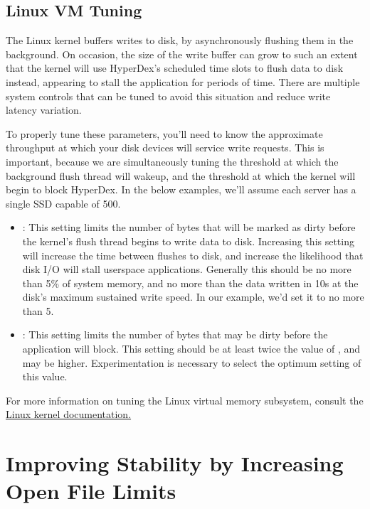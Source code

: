 \subsection{Linux VM Tuning}

The Linux kernel buffers writes to disk, by asynchronously flushing them in the
background.  On occasion, the size of the write buffer can grow to such an
extent that the kernel will use HyperDex's scheduled time slots to flush data to
disk instead, appearing to stall the application for periods of time.  There are
multiple system controls that can be tuned to avoid this situation and reduce
write latency variation.

To properly tune these parameters, you'll need to know the approximate
throughput at which your disk devices will service write requests.  This is
important, because we are simultaneously tuning the threshold at which the
background flush thread will wakeup, and the threshold at which the kernel will
begin to block HyperDex.  In the below examples, we'll assume each server has a
single SSD capable of \unit{500}{\mega\byte\per\second}.

\begin{itemize}
    \item {}:  This setting limits the number
        of bytes that will be marked as dirty before the kernel's flush thread
        begins to write data to disk.  Increasing this setting will increase the
        time between flushes to disk, and increase the likelihood that disk I/O
        will stall userspace applications.  Generally this should be no more
        than 5\% of system memory, and no more than the data written in 10s at
        the disk's maximum sustained write speed.  In our example, we'd set it
        to no more than \unit{5}{\giga\byte}.
    \item {}:  This setting limits the number of bytes
        that may be dirty before the application will block.  This setting
        should be at least twice the value of
        , and may be higher.  Experimentation
        is necessary to select the optimum setting of this value.
\end{itemize}

For more information on tuning the Linux virtual memory subsystem, consult the
\href{https://www.kernel.org/doc/Documentation/sysctl/vm.txt}{Linux kernel documentation.}

\section{Improving Stability by Increasing Open File Limits}

